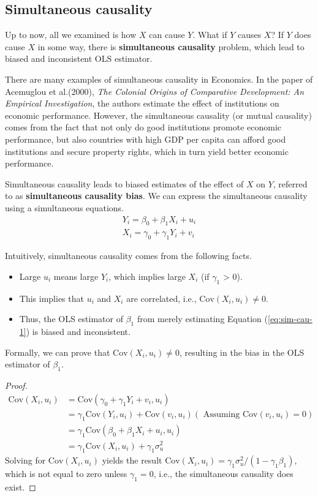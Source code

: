 \documentclass[a4paper,11pt]{article}
\newcommand{\cov}{\mathrm{Cov}}
\begin{document}
\subsection{Simultaneous causality}
\label{sec:org31ecc57}
Up to now, all we examined is how \(X\) can cause \(Y\). What if \(Y\) causes
\(X\)? If \(Y\) does cause \(X\) in some way, there is \textbf{simultaneous
causality} problem, which lead to biased and inconsistent OLS
estimator. 

There are many examples of simultaneous causality in Economics. In the
paper of Acemuglou et al.(2000), \emph{The Colonial Origins of Comparative
Development: An Empirical Investigation}, the authors estimate the
effect of institutions on economic performance. However, the
simultaneous causality (or mutual causality) comes from the fact that
not only do good institutions promote economic performance, but also
countries with high GDP per capita can afford good institutions and
secure property rights, which in turn yield better economic
performance. 

Simultaneous causality leads to biased estimates of the effect of \(X\)
on \(Y\), referred to as \textbf{simultaneous causality bias}. We can express
the simultaneous causality using a simultaneous equations.
\begin{gather}
Y_i = \beta_0 + \beta_1 X_i + u_i \label{eq:sim-cau-1} \\
X_i = \gamma_0 + \gamma_1 Y_i + v_i \label{eq:sim-cau-2}
\end{gather}

Intuitively, simultaneous causality comes from the following facts. 
\begin{itemize}
\item Large \(u_i\) means large \(Y_i\), which implies large \(X_i\) (if
\(\gamma_1\) > 0).
\item This implies that \(u_i\) and \(X_i\) are correlated, i.e., \(\cov(X_i,
  u_i) \neq 0\).
\item Thus, the OLS estimator of \(\beta_1\) from merely estimating Equation
(\ref{eq:sim-cau-1}) is biased and inconsistent.
\end{itemize}

Formally, we can prove that \(\cov(X_i, u_i) \neq 0\), resulting in the
bias in the OLS estimator of \(\beta_1\). 
\begin{proof}
\begin{align*}
\cov(X_i, u_i) &= \cov(\gamma_0 + \gamma_1 Y_i + v_i, u_i) \\
&= \gamma_1\cov(Y_i, u_i) + \cov(v_i, u_i) (\text{ Assuming } \cov(v_i, u_i)=0) \\
&= \gamma_1\cov(\beta_0 + \beta_1 X_i + u_i, u_i) \\
&= \gamma_1\cov(X_i, u_i) + \gamma_1\sigma^2_u
\end{align*}
Solving for $\cov(X_i, u_i)$ yields the result 
$\cov(X_i, u_i) = \gamma_1 \sigma^2_u /(1-\gamma_1\beta_1)$, which is not
equal to zero unless $\gamma_1 = 0$, i.e., the simultaneous causality does
exist. 
\end{proof}
\end{document}
